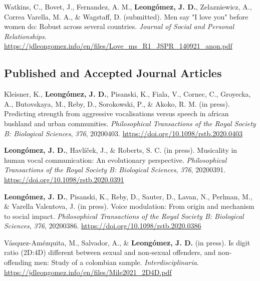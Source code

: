 \documentclass[11pt, a4paper]{awesome-cv}
\begin{document}
\leavevmode{}%
Watkins, C., Bovet, J., Fernandez, A. M., \textbf{Leongómez, J. D.},
Zelazniewicz, A., Correa Varella, M. A., \& Wagstaff, D. (submitted).
{Men say "I love you" before women do: Robust across several countries}.
\emph{Journal of Social and Personal Relationships}.
\url{https://jdleongomez.info/en/files/Love_ms_R1_JSPR_140921_anon.pdf}

\endgroup

\hypertarget{section-1}{%
\subsection{\texorpdfstring{\textbf{Published and Accepted Journal Articles}}{}}\label{section-1}}

\begingroup
\setlength{\parindent}{-0.5in}
\setlength{\leftskip}{0.5in}

\hypertarget{refs_journals}{}
\leavevmode{}%
Kleisner, K., \textbf{Leongómez, J. D.}, Pisanski, K., Fiala, V.,
Cornec, C., Groyecka, A., Butovskaya, M., Reby, D., Sorokowski, P., \&
Akoko, R. M. (in press). Predicting strength from aggressive
vocalisations versus speech in african bushland and urban communities.
\emph{Philosophical Transactions of the Royal Society B: Biological
Sciences}, \emph{376}, 20200403.
\url{https://doi.org/10.1098/rstb.2020.0403}

\leavevmode{}%
\textbf{Leongómez, J. D.}, Havlíček, J., \& Roberts, S. C. (in press).
Musicality in human vocal communication: {An} evolutionary perspective.
\emph{Philosophical Transactions of the Royal Society B: Biological
Sciences}, \emph{376}, 20200391.
\url{https://doi.org/10.1098/rstb.2020.0391}

\leavevmode{}%
\textbf{Leongómez, J. D.}, Pisanski, K., Reby, D., Sauter, D., Lavan,
N., Perlman, M., \& Varella Valentova, J. (in press). Voice modulation:
{From} origin and mechanism to social impact. \emph{Philosophical
Transactions of the Royal Society B: Biological Sciences}, \emph{376},
20200386. \url{https://doi.org/10.1098/rstb.2020.0386}

\leavevmode{}%
Vásquez-Amézquita, M., Salvador, A., \& \textbf{Leongómez, J. D.} (in
press). Is digit ratio (2D:4D) different between sexual and non-sexual
offenders, and non-offending men: Study of a colombian sample.
\emph{Interdisciplinaria}.
\url{https://jdleongomez.info/en/files/Mile2021_2D4D.pdf}
\end{document}
